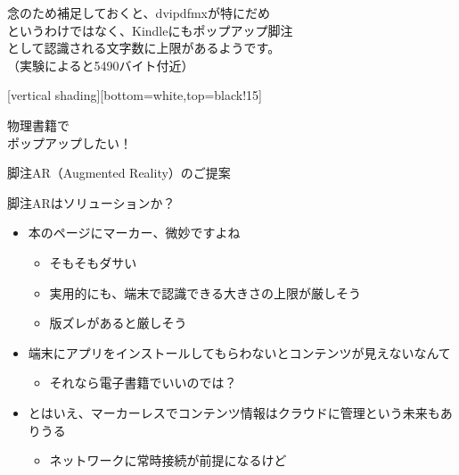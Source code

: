 \documentclass[14pt,dvipdfmx,uplatex]{beamer}
\begin{document}
\begin{frame}[plain]
  \begin{center}
    \yasagoth
    念のため補足しておくと、dvipdfmxが特にだめ\\
    というわけではなく、Kindleにもポップアップ脚注\\
    として認識される文字数に上限があるようです。\\
    （実験によると5490バイト付近）
  \end{center}
\end{frame}

[vertical shading][bottom=white,top=black!15]

\begin{frame}[plain]
  \begin{center}
    \color{miru}\yasagoth
    物理書籍で\\
    ポップアップしたい！
  \end{center}
\end{frame}

\begin{frame}[t]{\inhibitglue 脚注AR{\footnotesize （Augmented Reality）}のご提案}
  \sffamily
  \begin{center}
  \end{center}
\end{frame}

\begin{frame}[fragile]{\inhibitglue 脚注ARはソリューションか？}
  \sffamily
  \begin{itemize}
    \item 本のページにマーカー、微妙ですよね\\
      \begin{itemize}
        \item そもそもダサい
        \item 実用的にも、端末で認識できる大きさの上限が厳しそう
        \item 版ズレがあると厳しそう
      \end{itemize}
    \item 端末にアプリをインストールしてもらわないとコンテンツが見えないなんて\\
      \begin{itemize}
        \item それなら電子書籍でいいのでは？
      \end{itemize}
    \item とはいえ、マーカーレスでコンテンツ情報はクラウドに管理という未来もありうる\\
      \begin{itemize}
        \item ネットワークに常時接続が前提になるけど
      \end{itemize}
  \end{itemize}
\end{frame}
\end{document}
